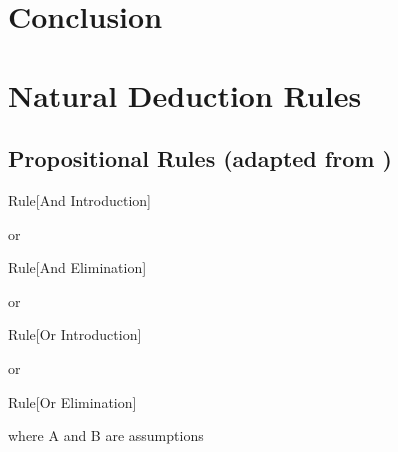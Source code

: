\section{Conclusion}

\appendix
\section{Natural Deduction Rules}
\label{appendix:nd}

\subsection{Propositional Rules (adapted from \cite{ndBook})}
\label{appendix:nd-prop}

\begin{namedthm}{Rule}[And Introduction]

\begin{bprooftree}
\end{bprooftree}\qquad or \qquad
\begin{bprooftree}
\end{bprooftree}

\end{namedthm}

\begin{namedthm}{Rule}[And Elimination]

\begin{bprooftree}
\end{bprooftree}\qquad or \qquad
\begin{bprooftree}
\end{bprooftree}

\end{namedthm}

\begin{namedthm}{Rule}[Or Introduction]

\begin{bprooftree}
\end{bprooftree}\qquad or \qquad
\begin{bprooftree}
\end{bprooftree}

\end{namedthm}

\begin{namedthm}{Rule}[Or Elimination]

\begin{bprooftree}
\end{bprooftree}\qquad where A and B are assumptions

\end{namedthm}

